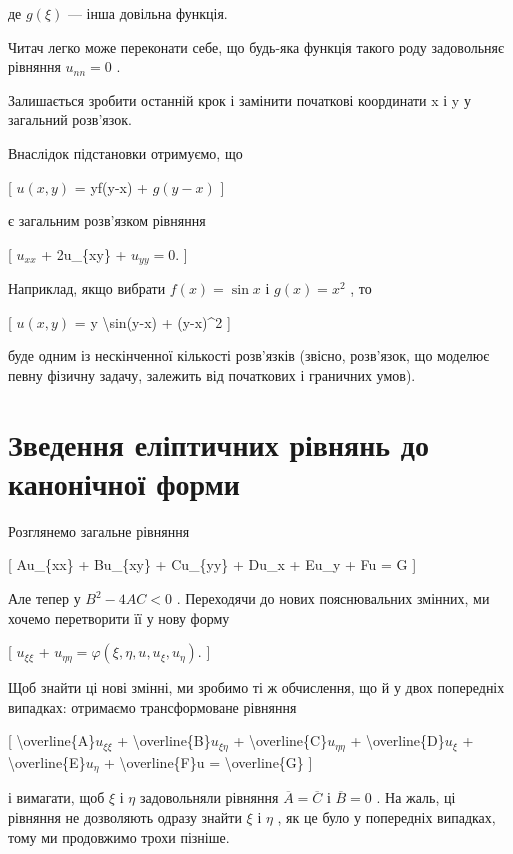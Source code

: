\documentclass[
]{article}
\begin{document}
{{{де \(g(\xi)\) --- інша довільна функція.

Читач легко може переконати себе, що будь-яка функція такого роду
задовольняє рівняння \(u_{nn} = 0\) .

Залишається зробити останній крок і замінити початкові координати x і y
у загальний розв'язок.

Внаслідок підстановки отримуємо, що

{[} \(u(x, y)\) = yf(y-x) + \(g(y-x)\) {]}

є загальним розв'язком рівняння

{[} \(u_{xx}\) + 2u\_\{xy\} + \(u_{yy} = 0\). {]}

Наприклад, якщо вибрати \(f(x) = \sin x\) і \(g(x) = x^2\) , то

{[} \(u(x, y)\) = y \textbackslash sin(y-x) + (y-x)\^{}2 {]}

буде одним із нескінченної кількості розв'язків (звісно, розв'язок, що
моделює певну фізичну задачу, залежить від початкових і граничних умов).

\section{Зведення еліптичних рівнянь до канонічної
форми}\label{ux437ux432ux435ux434ux435ux43dux43dux44f-ux435ux43bux456ux43fux442ux438ux447ux43dux438ux445-ux440ux456ux432ux43dux44fux43dux44c-ux434ux43e-ux43aux430ux43dux43eux43dux456ux447ux43dux43eux457-ux444ux43eux440ux43cux438}

Розглянемо загальне рівняння

{[} Au\_\{xx\} + Bu\_\{xy\} + Cu\_\{yy\} + Du\_x + Eu\_y + Fu = G {]}

Але тепер у \(B^2-4AC<0\) . Переходячи до нових пояснювальних змінних,
ми хочемо перетворити її у нову форму

{[} \(u_{\xi\xi}\) +
\(u_{\eta\eta} = \varphi(\xi, \eta, u, u_{\xi}, u_{\eta})\). {]}

Щоб знайти ці нові змінні, ми зробимо ті ж обчислення, що й у двох
попередніх випадках: отримаємо трансформоване рівняння

{[} \textbackslash overline\{A\}\(u_{\xi\xi}\) +
\textbackslash overline\{B\}\(u_{\xi\eta}\) +
\textbackslash overline\{C\}\(u_{\eta\eta}\) +
\textbackslash overline\{D\}\(u_{\xi}\) +
\textbackslash overline\{E\}\(u_{\eta}\) + \textbackslash overline\{F\}u
= \textbackslash overline\{G\} {]}

і вимагати, щоб \(\xi\) і \(\eta\) задовольняли рівняння
\(\overline{A}=\overline{C}\) і \(\overline{B}=0\) . На жаль, ці
рівняння не дозволяють одразу знайти \(\xi\) і \(\eta\) , як це було у
попередніх випадках, тому ми продовжимо трохи пізніше.

}}}
\end{document}
